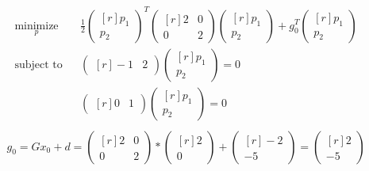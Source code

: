 \begin{equation*}
\begin{aligned}
& \underset{p}{\text{minimize}}
& & \frac{1}{2}
 \begin{pmatrix*}[r]
   p_1  \\
   p_2 
\end{pmatrix*}^
 {T}
 \begin{pmatrix*}[r]
  2 & 0 \\
  0 & 2
\end{pmatrix*}
  \begin{pmatrix*}[r]
   p_1  \\
   p_2 
\end{pmatrix*}
 +
 g
 _0^{T}
  \begin{pmatrix*}[r]
   p_1  \\
   p_2 
\end{pmatrix*} \\
& \text{subject to}
& & 
  \begin{pmatrix*}[r]
   -1  &
   2 
\end{pmatrix*} 
  \begin{pmatrix*}[r]
   p_1  \\
   p_2 
\end{pmatrix*} 
= 0  \\
& & & 
  \begin{pmatrix*}[r]
   0  &
   1 
\end{pmatrix*} 
  \begin{pmatrix*}[r]
   p_1  \\
   p_2 
\end{pmatrix*} 
= 0  \\
\end{aligned}
\end{equation*}
\newline
\newline
\begin{equation*}
\begin{aligned}
& g_0=Gx_0+d =
 \begin{pmatrix*}[r]
  2 & 0 \\
  0 & 2
\end{pmatrix*}*
\begin{pmatrix*}[r]
   2  \\
   0 
\end{pmatrix*}
+
\begin{pmatrix*}[r]
  -2  \\
  -5 
\end{pmatrix*}
=
\begin{pmatrix*}[r]
  2  \\
  -5 
\end{pmatrix*}
\end{aligned}
\end{equation*}
